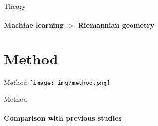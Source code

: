 \documentclass[xcolor={dvipsnames,table}]{beamer}
\newif\ifplacelogo{}  %
\begin{document}
\begin{frame}{Theory}
    \framesubtitle{Machine learning $>$ Riemannian geometry}
    {
        \scriptsize
        
    }
\end{frame}

\section{Method}
\begin{frame}{Method}
    \texttt{[image: img/method.png]}
\end{frame}

\placelogofalse{}
\begin{frame}{Method}
    \framesubtitle{Comparison with previous studies}

    {
        \tiny
        
    }
\end{frame}
\placelogotrue{}
\end{document}
